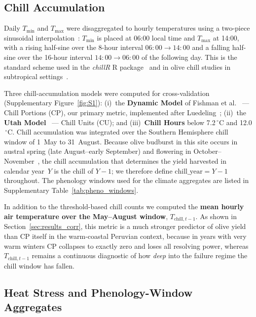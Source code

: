 \documentclass[agronomy,article,submit,pdftex,moreauthors]{Definitions/mdpi}
\begin{document}
\subsection{Chill Accumulation}
\label{sec:chill_models}

Daily $T_{\min}$ and $T_{\max}$ were disaggregated to hourly temperatures using a two-piece sinusoidal interpolation~\cite{linvill1990chillhours,deMeloAbreu2004}: $T_{\min}$ is placed at 06:00 local time and $T_{\max}$ at 14:00, with a rising half-sine over the 8-hour interval $06:00\to 14:00$ and a falling half-sine over the 16-hour interval $14:00\to 06:00$ of the following day. This is the standard scheme used in the \textit{chillR} R package~\cite{luedeling2018chillR,luedeling2021phenoflex} and in olive chill studies in subtropical settings~\cite{aguilera2014}.

Three chill-accumulation models were computed for cross-validation (Supplementary Figure~\ref{fig:S1}): (i)~the \textbf{Dynamic Model} of Fishman et al.~\cite{fishman1987a,fishman1987b} --- Chill Portions (CP), our primary metric, implemented after Luedeling~\cite{luedeling2018chillR,luedeling2021phenoflex}; (ii)~the \textbf{Utah Model}~\cite{richardson1974} --- Chill Units (CU); and (iii)~\textbf{Chill Hours} below 7.2$\,^\circ$C and 12.0$\,^\circ$C. Chill accumulation was integrated over the Southern Hemisphere chill window of 1~May to 31~August. Because olive budburst in this site occurs in austral spring (late August--early September) and flowering in October--November~\cite{machaca2022olive,larico2019olive}, the chill accumulation that determines the yield harvested in calendar year~$Y$ is the chill of $Y-1$; we therefore define $\text{chill\_year}=Y-1$ throughout. The phenology windows used for the climate aggregates are listed in Supplementary Table~\ref{tab:pheno_windows}.

In addition to the threshold-based chill counts we computed the \textbf{mean hourly air temperature over the May--August window}, $T_{\text{chill},t-1}$. As shown in Section~\ref{sec:results_corr}, this metric is a much stronger predictor of olive yield than CP itself in the warm-coastal Peruvian context, because in years with very warm winters CP collapses to exactly zero and loses all resolving power, whereas $T_{\text{chill},t-1}$ remains a continuous diagnostic of how \emph{deep} into the failure regime the chill window has fallen.

\subsection{Heat Stress and Phenology-Window Aggregates}
\label{sec:heat_stress}
\end{document}
